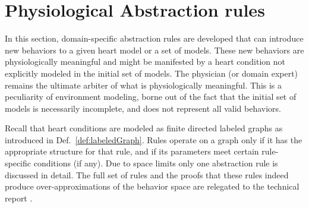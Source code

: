 \section{Physiological Abstraction rules}
\label{abstractionRules} 
In this section, domain-specific abstraction rules are developed that can introduce new behaviors to a given heart model or a set of models. 
These new behaviors are physiologically meaningful and might be manifested by a heart condition not explicitly modeled in the initial set of models.
The physician (or domain expert) remains the ultimate arbiter of what is physiologically meaningful.
This is a peculiarity of environment modeling, borne out of the fact that the initial set of models is necessarily incomplete, and does not represent all valid behaviors.

Recall that heart conditions are modeled as finite directed labeled graphs as introduced in Def.~\ref{def:labeledGraph}.
Rules operate on a graph only if it has the appropriate structure for that rule, and if its parameters meet certain rule-specific conditions (if any).
Due to space limits only one abstraction rule is discussed in detail. The full set of rules and the proofs that these rules indeed produce over-approximations of the behavior space are relegated to the technical report \cite{regar_tech}.
%
%


